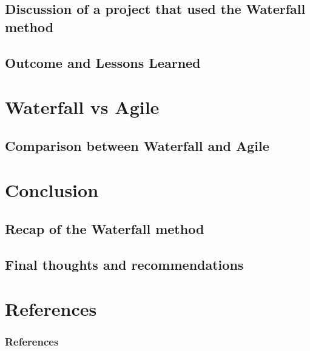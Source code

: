 \documentclass{beamer}
\begin{document}
\subsection{Discussion of a project that used the Waterfall method}
\subsection{Outcome and Lessons Learned}



\section{Waterfall vs Agile}
\subsection{Comparison between Waterfall and Agile}


\section{Conclusion}
\subsection{Recap of the Waterfall method}
\subsection{Final thoughts and recommendations}



\section*{References}
\begin{frame}
    \frametitle{References}
    
    
\end{frame}
\end{document}
